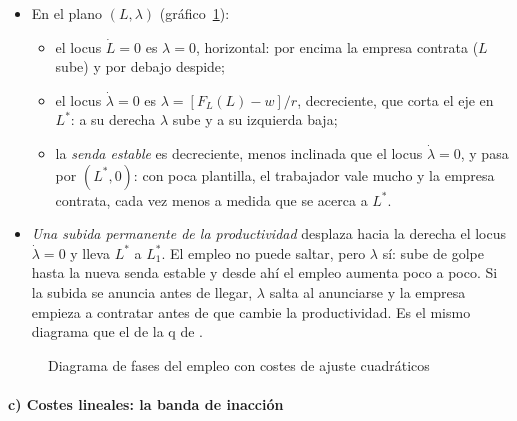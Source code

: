 \documentclass[11pt]{article}
\begin{document}
\begin{itemize}
\item En el plano $(L,\lambda)$ (gráfico~\ref{fig:fases-empleo}):
  \begin{itemize}
  \item el locus $\dot L=0$ es $\lambda=0$, horizontal: por encima la empresa contrata ($L$ sube) y por debajo despide;
  \item el locus $\dot\lambda=0$ es $\lambda=[F_L(L)-w]/r$, decreciente, que corta el eje en $L^*$: a su derecha $\lambda$ sube y a su izquierda baja;
  \item la \emph{senda estable} es decreciente, menos inclinada que el locus $\dot\lambda=0$, y pasa por $(L^*,0)$: con poca plantilla, el trabajador vale mucho y la empresa contrata, cada vez menos a medida que se acerca a $L^*$.
  \end{itemize}
\item \emph{Una subida permanente de la productividad} desplaza hacia la derecha el locus $\dot\lambda=0$ y lleva $L^*$ a $L^*_1$. El empleo no puede saltar, pero $\lambda$ sí: sube de golpe hasta la nueva senda estable y desde ahí el empleo aumenta poco a poco. Si la subida se anuncia antes de llegar, $\lambda$ salta al anunciarse y la empresa empieza a contratar antes de que cambie la productividad. Es el mismo diagrama que el de la q de  .
\end{itemize}

\begin{figure}[H]
\centering
\caption{Diagrama de fases del empleo con costes de ajuste cuadráticos}\label{fig:fases-empleo}
\end{figure}

\paragraph{c) Costes lineales: la banda de inacción}
\end{document}

